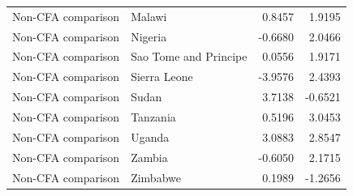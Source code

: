 \begin{table}
\begin{tabular}[t]{llrr}
Non-CFA comparison & Malawi & 0.8457 & 1.9195\\
Non-CFA comparison & Nigeria & -0.6680 & 2.0466\\
Non-CFA comparison & Sao Tome and Principe & 0.0556 & 1.9171\\
Non-CFA comparison & Sierra Leone & -3.9576 & 2.4393\\
\addlinespace
Non-CFA comparison & Sudan & 3.7138 & -0.6521\\
Non-CFA comparison & Tanzania & 0.5196 & 3.0453\\
Non-CFA comparison & Uganda & 3.0883 & 2.8547\\
Non-CFA comparison & Zambia & -0.6050 & 2.1715\\
Non-CFA comparison & Zimbabwe & 0.1989 & -1.2656\\
\bottomrule
\end{tabular}
\end{table}